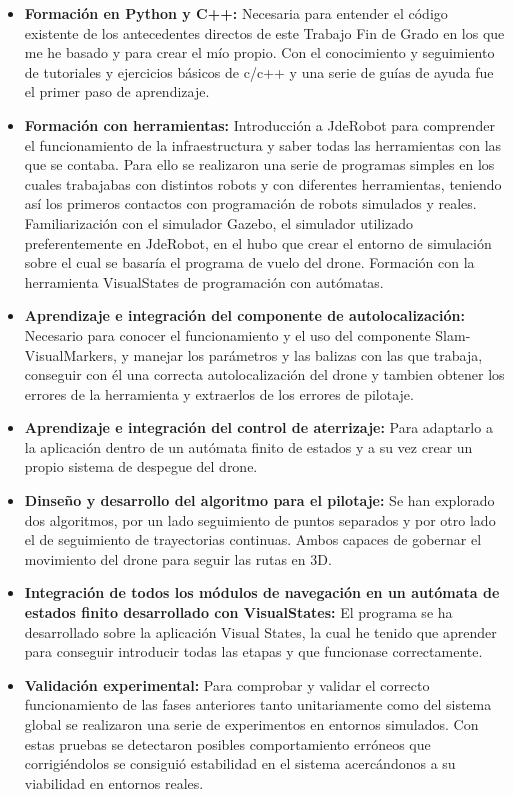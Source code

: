 \begin{itemize}
	\item \textbf{Formación en Python y C++:} Necesaria para entender el código existente de los antecedentes
directos de este Trabajo Fin de
Grado en los que me he basado y para crear el mío propio. Con el conocimiento y seguimiento de tutoriales y ejercicios básicos de c/c++ y una serie de guías de ayuda fue el  primer paso de aprendizaje.
	\item \textbf{Formación con herramientas:} Introducción a JdeRobot para comprender el funcionamiento de la infraestructura y saber todas las herramientas con las que se contaba. Para ello se realizaron una serie de programas simples en los cuales trabajabas con distintos robots y con diferentes herramientas, teniendo así los primeros contactos con programación de robots simulados y reales. Familiarización con el simulador Gazebo, el simulador utilizado preferentemente en JdeRobot, en el hubo que crear el entorno de simulación sobre el cual se basaría el programa de vuelo del drone. Formación con la herramienta VisualStates de programación con autómatas.	
	\item \textbf{Aprendizaje e integración del componente de autolocalización:} Necesario para conocer el funcionamiento y el uso del componente Slam-VisualMarkers, y manejar los parámetros y las balizas con las que trabaja, conseguir con él una correcta autolocalización del drone y tambien obtener los errores de la herramienta y extraerlos de los errores de pilotaje.
	\item \textbf{Aprendizaje e integración del control de aterrizaje:} Para adaptarlo a la aplicación dentro de un autómata finito de estados y a su vez crear un propio sistema de despegue del drone.
	\item \textbf{Dinseño y desarrollo del algoritmo para el pilotaje:} Se han explorado dos algoritmos, por un lado seguimiento de puntos separados y por otro lado el de seguimiento de trayectorias continuas. Ambos capaces de gobernar el movimiento del drone para seguir las rutas en 3D.
	\item \textbf{Integración de todos los módulos de navegación en un autómata de estados finito desarrollado con VisualStates:} El programa se ha desarrollado sobre la aplicación Visual States, la cual he tenido que aprender para conseguir introducir todas las etapas y que funcionase correctamente. 
	\item \textbf{Validación experimental:} Para comprobar y validar el correcto funcionamiento de las fases anteriores tanto unitariamente como del sistema global se realizaron una serie de experimentos en entornos simulados. Con estas pruebas se detectaron posibles comportamiento erróneos que corrigiéndolos se consiguió estabilidad en el sistema acercándonos a su viabilidad en entornos reales.   
\end{itemize}
